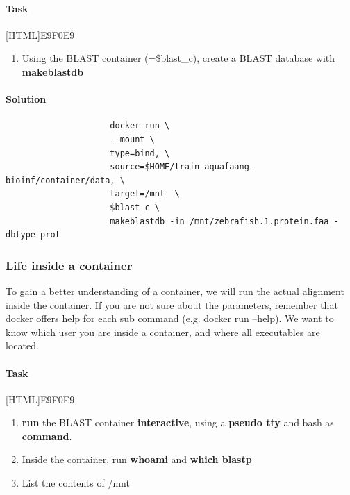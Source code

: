 \documentclass[12pt]{article}
\begin{document}
		

			\paragraph{Task}
				[HTML]{E9F0E9}{\parbox{\linewidth}{%
					\begin{enumerate}
						\item Using the BLAST container (=\$blast\_c), create a BLAST database with \textbf{makeblastdb} 						
					\end{enumerate}
				}}
			
			\paragraph{Solution}	
		
				\begin{minipage}{\linewidth}
					\begin{lstlisting}
					 docker run \
					 --mount \
					 type=bind, \
					 source=$HOME/train-aquafaang-bioinf/container/data, \
					 target=/mnt  \
					 $blast_c \
					 makeblastdb -in /mnt/zebrafish.1.protein.faa -dbtype prot
		 			\end{lstlisting}
				\end{minipage}
			
			\subsubsection{Life inside a container}
				To gain a better understanding of a container, we will run the actual alignment inside the container. 
				If you are not sure about the parameters, remember that docker offers help for each sub command (e.g. docker run --help).
				We want to know which user you are inside a container, and where all executables are located.
			
			
			
			\paragraph{Task}
				\fcolorbox{black}[HTML]{E9F0E9}{\parbox{\linewidth}{%
						\begin{enumerate}
							\item \textbf{run} the BLAST container \textbf{interactive}, using a \textbf{pseudo tty} and bash as \textbf{command}. 
							\item Inside the container, run \textbf{whoami} and \textbf{which blastp} 
							\item List the contents of /mnt
						\end{enumerate}
				}}
\end{document}
